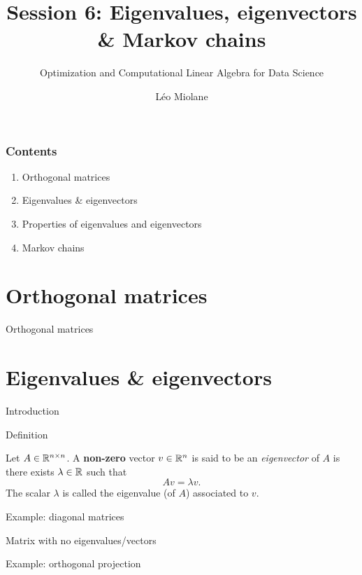 \documentclass{beamer}
\title{Session 6: Eigenvalues, eigenvectors \& Markov chains}
\subtitle{Optimization and Computational Linear Algebra for Data Science}
\author{Léo Miolane}
\date{}
\begin{document}
\setcounter{showProgressBar}{0}
\setcounter{showSlideNumbers}{0}

\frame{\titlepage}

\begin{frame}
	\frametitle{Contents}
	\begin{enumerate}
		\item Orthogonal matrices
		\item Eigenvalues \& eigenvectors
		\item Properties of eigenvalues and eigenvectors
		\item Markov chains
	\end{enumerate}
\end{frame}


\setcounter{framenumber}{0}
\setcounter{showSlideNumbers}{1}

\section{Orthogonal matrices}

\begin{frame}[t]{Orthogonal matrices}
	\grid

\end{frame}

\section{Eigenvalues \& eigenvectors}
\begin{frame}[t]{Introduction}
	\grid

\end{frame}

\begin{frame}[t]{Definition}
	\grid

	\vspace{-0.4cm}
	\begin{definition}\label{def:eigen}
		Let $A \in \mathbb{R}^{n \times n}$. A \textbf{non-zero} vector $v \in \mathbb{R}^n$ is said to be an \emph{eigenvector} of $A$ is there exists $\lambda \in \mathbb{R}$ such that
		$$
		A v = \lambda v.
		$$
		The scalar $\lambda$ is called the eigenvalue (of $A$) associated to $v$. 
	\end{definition}
\end{frame}

\begin{frame}[t]{Example: diagonal matrices}
	\grid

\end{frame}
\begin{frame}[t]{Matrix with no eigenvalues/vectors}
	\grid

\end{frame}
\begin{frame}[t]{Example: orthogonal projection}
	\grid

\end{frame}
\end{document}
